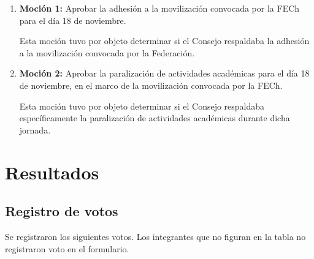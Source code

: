 \documentclass[12pt,letterpaper]{article}
\begin{document}
\begin{enumerate}
  \item \textbf{Moción 1:} Aprobar la adhesión a la movilización convocada por la FECh para el día 18 de noviembre.

  Esta moción tuvo por objeto determinar si el Consejo respaldaba la adhesión a la movilización convocada por la Federación.

  \item \textbf{Moción 2:} Aprobar la paralización de actividades académicas para el día 18 de noviembre, en el marco de la movilización convocada por la FECh.

  Esta moción tuvo por objeto determinar si el Consejo respaldaba específicamente la paralización de actividades académicas durante dicha jornada.
\end{enumerate}

\section{Resultados}

\subsection{Registro de votos}

Se registraron los siguientes votos. Los integrantes que no figuran en la tabla no registraron voto en el formulario.
\end{document}

